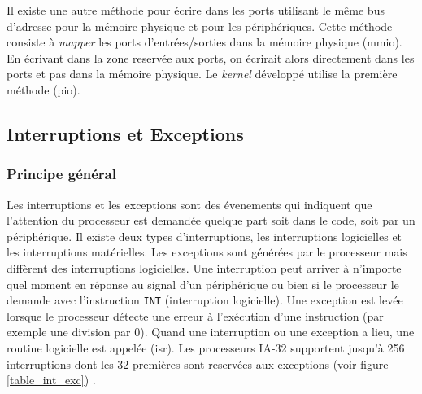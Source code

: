 Il existe une autre méthode pour écrire dans les ports utilisant le même bus d'adresse
pour la mémoire physique et pour les périphériques. Cette méthode consiste à
\textit{mapper} les ports d'entrées/sorties dans la mémoire physique (\acrshort{mmio}).
En écrivant dans la zone reservée aux ports, on écrirait alors directement dans
les ports et pas dans la mémoire physique. Le \textit{kernel} développé utilise
la première méthode (\acrshort{pio}).


\subsection{Interruptions et Exceptions}
\subsubsection{Principe général}
Les interruptions et les exceptions sont des évenements qui indiquent que l'attention
du processeur est demandée quelque part soit dans le code, soit par un périphérique.
Il existe deux types d'interruptions, les interruptions logicielles et les interruptions
matérielles. Les exceptions sont générées par le processeur mais diffèrent des
interruptions logicielles. Une interruption peut arriver à n'importe quel moment
en réponse au signal d'un périphérique ou bien si le processeur le demande
avec l'instruction \texttt{INT} (interruption logicielle). Une exception
est levée lorsque le processeur détecte une erreur à l'exécution d'une instruction
(par exemple une division par 0). Quand une interruption ou une exception
a lieu, une routine logicielle est appelée (\acrshort{isr}). Les processeurs \acrshort{IA-32}
supportent jusqu'à 256 interruptions dont les 32 premières sont reservées aux exceptions
(voir figure \ref{table_int_exc}) \cite{ref42,ref66}. \\

